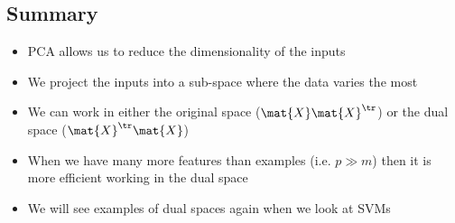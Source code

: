 
\begin{slide}
\section[-1]{Summary}

\begin{PauseHighLight}
\label{last}

\begin{itemize}
\item PCA allows us to reduce the dimensionality of the inputs\pause
\item We project the inputs into a sub-space where the data varies the most\pause
\item We can work in either the original space ($\mat{X}\mat{X}^\tr$) or
  the dual space ($\mat{X}^\tr\mat{X}$)\pause
\item When we have many more features than examples (i.e. $p\gg m$) then
  it is more efficient working in the dual space\pause
\item We will see examples of dual spaces again when we look at SVMs\pauseb
\end{itemize}




\end{PauseHighLight}
\end{slide}



